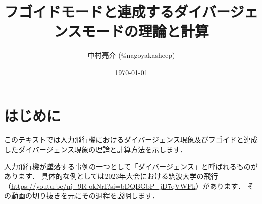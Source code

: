 \documentclass{jarticle}
\title{フゴイドモードと連成するダイバージェンスモードの理論と計算}
\author{中村亮介 (@nagoyakasheep) }
\date{\today} %
\begin{document}
\maketitle

\section{はじめに}

このテキストでは人力飛行機におけるダイバージェンス現象及びフゴイドと連成したダイバージェンス現象の理論と計算方法を示します．

人力飛行機が墜落する事例の一つとして「ダイバージェンス」と呼ばれるものがあります．
具体的な例としては2023年大会における筑波大学の飛行（\url{https://youtu.be/nj_9R-okNrI?si=bDQBGbP_jD7qVWFk}）があります．
その動画の切り抜きを元にその過程を説明します．
\end{document}
